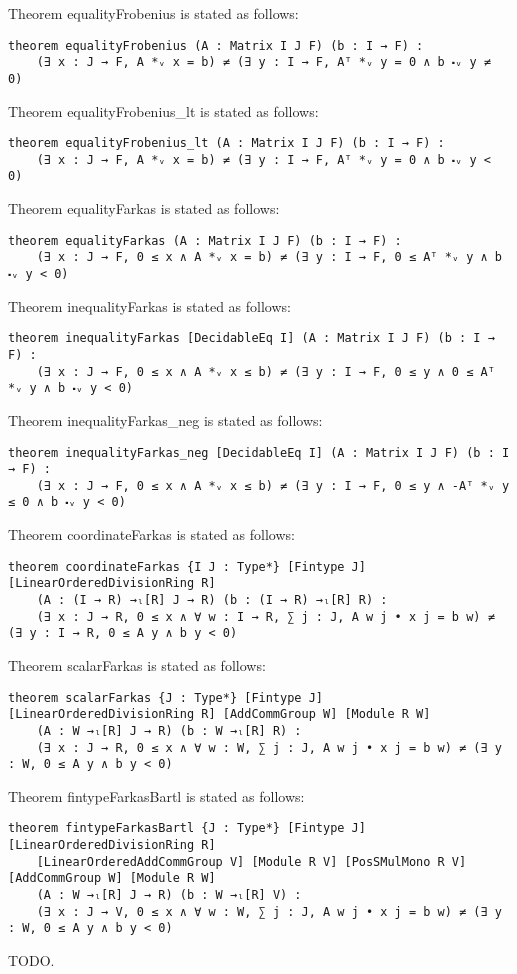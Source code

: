 \documentclass[]{article}
\renewcommand{\.}{\hskip .75pt}
\begin{document}
\noindent
Theorem equalityFrobenius is stated as follows:
\begin{lstlisting}
theorem equalityFrobenius (A : Matrix I J F) (b : I → F) :
    (∃ x : J → F, A *ᵥ x = b) ≠ (∃ y : I → F, Aᵀ *ᵥ y = 0 ∧ b ⬝ᵥ y ≠ 0)
\end{lstlisting}
Theorem equalityFrobenius\_lt is stated as follows:
\begin{lstlisting}
theorem equalityFrobenius_lt (A : Matrix I J F) (b : I → F) :
    (∃ x : J → F, A *ᵥ x = b) ≠ (∃ y : I → F, Aᵀ *ᵥ y = 0 ∧ b ⬝ᵥ y < 0)
\end{lstlisting}
Theorem equalityFarkas is stated as follows:
\begin{lstlisting}
theorem equalityFarkas (A : Matrix I J F) (b : I → F) :
    (∃ x : J → F, 0 ≤ x ∧ A *ᵥ x = b) ≠ (∃ y : I → F, 0 ≤ Aᵀ *ᵥ y ∧ b ⬝ᵥ y < 0)
\end{lstlisting}
Theorem inequalityFarkas is stated as follows:
\begin{lstlisting}
theorem inequalityFarkas [DecidableEq I] (A : Matrix I J F) (b : I → F) :
    (∃ x : J → F, 0 ≤ x ∧ A *ᵥ x ≤ b) ≠ (∃ y : I → F, 0 ≤ y ∧ 0 ≤ Aᵀ *ᵥ y ∧ b ⬝ᵥ y < 0)
\end{lstlisting}
Theorem inequalityFarkas\_neg is stated as follows:
\begin{lstlisting}
theorem inequalityFarkas_neg [DecidableEq I] (A : Matrix I J F) (b : I → F) :
    (∃ x : J → F, 0 ≤ x ∧ A *ᵥ x ≤ b) ≠ (∃ y : I → F, 0 ≤ y ∧ -Aᵀ *ᵥ y ≤ 0 ∧ b ⬝ᵥ y < 0)
\end{lstlisting}
Theorem coordinateFarkas is stated as follows:
\begin{lstlisting}
theorem coordinateFarkas {I J : Type*} [Fintype J] [LinearOrderedDivisionRing R]
    (A : (I → R) →ₗ[R] J → R) (b : (I → R) →ₗ[R] R) :
    (∃ x : J → R, 0 ≤ x ∧ ∀ w : I → R, ∑ j : J, A w j • x j = b w) ≠ (∃ y : I → R, 0 ≤ A y ∧ b y < 0)
\end{lstlisting}
Theorem scalarFarkas is stated as follows:
\begin{lstlisting}
theorem scalarFarkas {J : Type*} [Fintype J] [LinearOrderedDivisionRing R] [AddCommGroup W] [Module R W]
    (A : W →ₗ[R] J → R) (b : W →ₗ[R] R) :
    (∃ x : J → R, 0 ≤ x ∧ ∀ w : W, ∑ j : J, A w j • x j = b w) ≠ (∃ y : W, 0 ≤ A y ∧ b y < 0)
\end{lstlisting}
Theorem fintypeFarkasBartl is stated as follows:
\begin{lstlisting}
theorem fintypeFarkasBartl {J : Type*} [Fintype J] [LinearOrderedDivisionRing R]
    [LinearOrderedAddCommGroup V] [Module R V] [PosSMulMono R V] [AddCommGroup W] [Module R W]
    (A : W →ₗ[R] J → R) (b : W →ₗ[R] V) :
    (∃ x : J → V, 0 ≤ x ∧ ∀ w : W, ∑ j : J, A w j • x j = b w) ≠ (∃ y : W, 0 ≤ A y ∧ b y < 0)
\end{lstlisting}
TODO.
\end{document}
